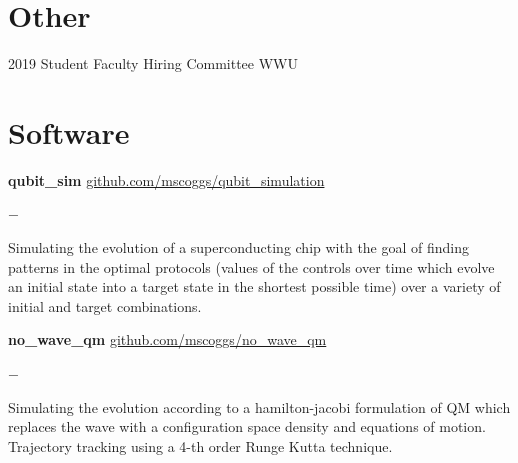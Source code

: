 \documentclass[]{scoggins-cv} %
\begin{document}
  \section{Other}
      \begin{entrylist}


          \entry
          {2019}
          {Student Faculty Hiring Committee}
          {WWU}


      \end{entrylist}


    \section{Software}

    \begin{entrylist}


        \entry
        {\textbf{qubit\_sim}}
        {\textnormal{\url{github.com/mscoggs/qubit_simulation}}}
        {}
        {%
            \vspace{-1em}
            \begin{list}{{\color{numcolor}$-$}}{\cvlist}
                \item Simulating the evolution of a superconducting chip with the goal of finding patterns in the optimal protocols (values of the controls over time which evolve an initial state into a target state in the shortest possible time) over a variety of initial and target combinations.
            \end{list}
        }


        \entry
        {\textbf{no\_wave\_qm}}
        {\textnormal{\url{github.com/mscoggs/no_wave_qm}}}
        {}
        {%
            \vspace{-1em}
            \begin{list}{{\color{numcolor}$-$}}{\cvlist}
                \item Simulating the evolution according to a hamilton-jacobi formulation of QM which replaces the wave with a configuration space density and equations of motion. Trajectory tracking using a 4-th order Runge Kutta technique.
            \end{list}
        }



    \end{entrylist}
\end{document}
